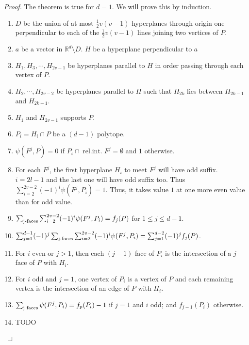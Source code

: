 \documentclass[a4paper,10pt,landscape]{article}
\def\R{\mathbb{R}}
\def\relint{\operatorname{rel. int.}}
\begin{document}
\begin{multicols}{3}
    \begin{proof}
      The theorem is true for $d = 1$. We will prove this by induction.
      \begin{enumerate}
        \item $D$ be the union of at most $\frac{1}{2} v(v-1)$ hyperplanes
          through origin one perpendicular to each of the $\frac{1}{2}v(v-1)$
          lines joining two vertices of $P$.
        \item $a$ be a vector in $\R^d \setminus D$. $H$ be a hyperplane
          perpendicular to $a$
        \item $H_1, H_3, \cdots, H_{2v -1}$ be hyperplanes parallel to $H$ in
          order passing through each vertex of $P$.
        \item $H_2, \cdots, H_{2v-2}$ be hyperplanes parallel to $H$ such that
          $H_{2k}$ lies between $H_{2k-1}$ and $H_{2k + 1}$.
        \item $H_1$ and  $H_{2v - 1}$ supports $P$.
        \item $P_i = H_i \cap P$ be a $(d-1)$ polytope.
        \item $\psi (F^j, P) = 0$ if $P_i \cap \relint F^j = \emptyset$ and $1$
          otherwise.
        \item For each $F^j$, the first hyperplane $H_i$ to meet $F^j$ will have
          odd suffix. $i = 2l - 1$ and the last one will have odd suffix too.
          Thus $\sum_{i=2}^{2v-2} (-1)^i \psi(F^j, P_i) = 1$. Thus, it takes
          value $1$ at one more even value than for odd value.
        \item $\sum_{\textup{j-faces}}\sum_{i=2}^{2v-2} (-1)^i \psi(F^j, P_i) =
          f_j(P)$ for $1 \le j \le d - 1$.
        \item $\sum_{j = 1}^{d-1} (-1)^j \sum_{\textup{j-faces}}
          \sum_{i=2}^{2v-2} (-1)^i \psi(F^j, P_i) = \sum_{j = 1}^{d-2} (-1)^j
          f_j(P)$.
        \item For $i$ even or $j > 1$, then each $(j-1)$ face of $P_i$ is the
          intersection of a $j$ face of $P$ with $H_i$.
        \item For $i$ odd and $j =1$, one vertex of $P_i$ is a vertex of $P$ and
          each remaining vertex is the intersection of an edge of $P$ with
          $H_i$.
        \item $\sum_{\textup{j faces}} \psi(F^j, P_i) = f_p(P_i) -1$ if $j = 1$
          and $i$ odd; and $f_{j-1}(P_i)$ otherwise.
        \item TODO
      \end{enumerate}
    \end{proof}


\end{multicols}
\end{document}

